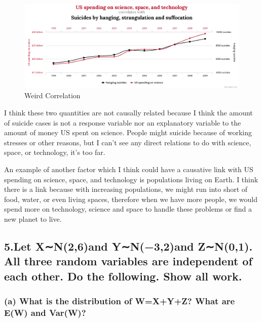 \documentclass[
]{article}
\begin{document}
\begin{figure}
\centering
\includegraphics{"chart.png"}
\caption{Weird Correlation}
\end{figure}

I think these two quantities are not causally related because I think
the amount of suicide cases is not a response variable nor an
explanatory variable to the amount of money US spent on science. People
might suicide because of working stresses or other reasons, but I can't
see any direct relations to do with science, space, or technology, it's
too far.

An example of another factor which I think could have a causative link
with US spending on science, space, and technology is populations living
on Earth. I think there is a link because with increasing populations,
we might run into short of food, water, or even living spaces, therefore
when we have more people, we would spend more on technology, science and
space to handle these problems or find a new planet to live.

\hypertarget{let-xn26and-yn32and-zn01.-all-three-random-variables-are-independent-of-each-other.-do-the-following.-show-all-work.}{%
\subsection{5.Let X∼N(2,6)and Y∼N(−3,2)and Z∼N(0,1). All three random
variables are independent of each other. Do the following. Show all
work.}\label{let-xn26and-yn32and-zn01.-all-three-random-variables-are-independent-of-each-other.-do-the-following.-show-all-work.}}

\hypertarget{a-what-is-the-distribution-of-wxyz-what-are-ew-and-varw}{%
\subsubsection{(a) What is the distribution of W=X+Y+Z? What are E(W)
and
Var(W)?}\label{a-what-is-the-distribution-of-wxyz-what-are-ew-and-varw}}
\end{document}
